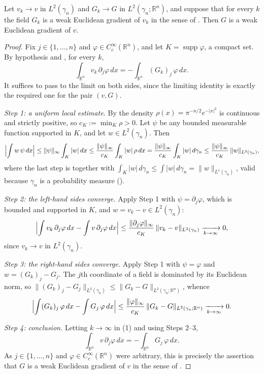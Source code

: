 \begin{lemma}
Let $v_k \to v$ in $L^2(\gamma_n)$ and $G_k \to G$ in
$L^2(\gamma_n;\mathbb{R}^n)$, and suppose that for every $k$ the field $G_k$ is a
weak Euclidean gradient of $v_k$ in the sense of .
Then $G$ is a weak Euclidean gradient of $v$.
\end{lemma}
\begin{proof}
Fix $j \in \{1,\ldots,n\}$ and $\varphi \in C_c^\infty(\mathbb{R}^n)$, and let
$K = \operatorname{supp}\varphi$, a compact set.  By hypothesis and
, for every $k$,
\begin{equation*}
  \int_{\mathbb{R}^n} v_k\, \partial_j\varphi \, dx
    = -\int_{\mathbb{R}^n} (G_k)_j\, \varphi\, dx . \tag{1}
\end{equation*}
It suffices to pass to the limit on both sides, since the limiting identity is
exactly the required one for the pair $(v,G)$.

\emph{Step 1: a uniform local estimate.}
By  the density $\rho(x) = \pi^{-n/2}e^{-|x|^2}$ is
continuous and strictly positive, so $c_K := \min_K \rho > 0$.  Let $\psi$ be any
bounded measurable function supported in $K$, and let $w \in L^2(\gamma_n)$.
Then
\[
  \Bigl|\int w\,\psi\, dx\Bigr|
    \leq \|\psi\|_\infty \int_K |w| \, dx
    \leq \frac{\|\psi\|_\infty}{c_K}\int_K |w|\, \rho \, dx
    = \frac{\|\psi\|_\infty}{c_K}\int_K |w|\, d\gamma_n
    \leq \frac{\|\psi\|_\infty}{c_K}\,\|w\|_{L^2(\gamma_n)} ,
\]
where the last step is  together with
$\int_K|w|\,d\gamma_n \leq \int |w|\, d\gamma_n = \|w\|_{L^1(\gamma_n)}$, valid
because $\gamma_n$ is a probability measure ().

\emph{Step 2: the left-hand sides converge.}
Apply Step 1 with $\psi = \partial_j\varphi$, which is bounded and supported in
$K$, and $w = v_k - v \in L^2(\gamma_n)$:
\[
  \Bigl|\int v_k\,\partial_j\varphi\, dx - \int v\,\partial_j\varphi\, dx\Bigr|
    \leq \frac{\|\partial_j\varphi\|_\infty}{c_K}\,\|v_k - v\|_{L^2(\gamma_n)}
    \xrightarrow[k\to\infty]{} 0 ,
\]
since $v_k \to v$ in $L^2(\gamma_n)$.

\emph{Step 3: the right-hand sides converge.}
Apply Step 1 with $\psi = \varphi$ and $w = (G_k)_j - G_j$.  The $j$th coordinate
of a field is dominated by its Euclidean norm, so
$\|(G_k)_j - G_j\|_{L^2(\gamma_n)} \leq \|G_k - G\|_{L^2(\gamma_n;\mathbb{R}^n)}$,
whence
\[
  \Bigl|\int (G_k)_j\,\varphi\, dx - \int G_j\,\varphi\, dx\Bigr|
    \leq \frac{\|\varphi\|_\infty}{c_K}\,\|G_k - G\|_{L^2(\gamma_n;\mathbb{R}^n)}
    \xrightarrow[k\to\infty]{} 0 .
\]

\emph{Step 4: conclusion.}
Letting $k \to \infty$ in (1) and using Steps 2--3,
\[
  \int_{\mathbb{R}^n} v\,\partial_j\varphi\, dx
    = -\int_{\mathbb{R}^n} G_j\,\varphi\, dx .
\]
As $j \in \{1,\ldots,n\}$ and $\varphi \in C_c^\infty(\mathbb{R}^n)$ were
arbitrary, this is precisely the assertion that $G$ is a weak Euclidean gradient
of $v$ in the sense of .
\end{proof}
